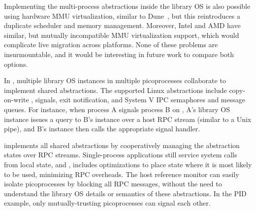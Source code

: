 Implementing the multi-process abstractions
inside the library OS is also possible using 
hardware MMU virtualization, similar to Dune~\cite{belay12dune},
but this reintroduces a duplicate scheduler and memory management.
Moreover, Intel and AMD have similar, but mutually incompatible MMU virtualization support,
which would complicate live migration across platforms.
None of these problems are insurmountable, and it would be interesting in future
work to compare both options.


In \graphene{}, multiple library OS instances in multiple picoprocesses collaborate to implement shared abstractions. The supported Linux abstractions include copy-on-write , signals, exit notification, and System V IPC semaphores and message queues.
For instance, when process A signals process B on \graphene{}, A's library OS instance issues a query to B's instance over a host RPC stream (similar to a Unix pipe), and B's instance then calls the appropriate signal handler.




\graphene{} implements all shared abstractions by cooperatively managing the abstraction states over RPC streams.
Single-process applications still service system calls from local state, and \graphene{}, includes optimizations to place state where it is most likely to be used, minimizing RPC overheads.
The host reference monitor can easily isolate picoprocesses by 
blocking all RPC messages, %
without the need to understand the library OS details or semantics of these abstractions.
In the PID example, only mutually-trusting picoprocesses can signal each other.

